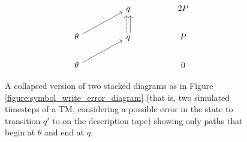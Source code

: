 \documentclass[english,letter paper,12pt,reqno]{article}
\theoremstyle{definition}
\begin{document}
\begin{figure}[htpb]
    \centering
\[\begin{tikzcd}
	&& q && 2P \\
	\theta && q && P \\
	\theta &&&& 0
	\arrow[from=2-1, to=1-3]
	\arrow[shift left, dashed, from=2-3, to=1-3]
	\arrow[shift right, from=2-3, to=1-3]
	\arrow[from=3-1, to=2-3]
\end{tikzcd}\]
\caption{\label{figure:state_error_two_steps_main} A collapsed version of two stacked diagrams as in Figure \ref{figure:symbol_write_error_diagram} (that is, two simulated timesteps of a TM, considering a possible error in the state to transition $q'$ to on the description tape) showing only paths that begin at $\theta$ and end at $q$.}
\end{figure}
\end{document}
